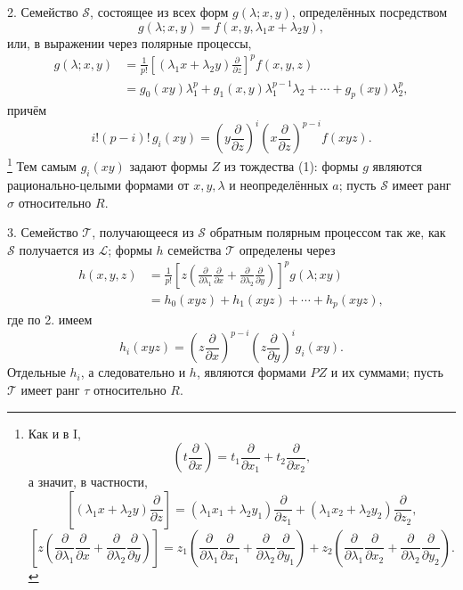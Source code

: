 \documentclass[11pt]{article}
\begin{document}
2. Семейство $\mathcal S$, состоящее из всех форм $g(\lambda;x,y)$, определённых посредством
\[
  g(\lambda;x,y)=f(x,y,\lambda_1x+\lambda_2y),
\]
или, в выражении через полярные процессы,
\[
\begin{aligned}
  g(\lambda;x,y)
  &=\frac1{p!}\left[(\lambda_1x+\lambda_2y)\frac{\partial}{\partial z}\right]^p f(x,y,z) \\
  &=g_0(xy)\lambda_1^p+g_1(x,y)\lambda_1^{p-1}\lambda_2+\cdots+g_p(xy)\lambda_2^p,
\end{aligned}
\]
причём
\[
  i!(p-i)!\,g_i(xy)=
  \left(y\frac{\partial}{\partial z}\right)^i
  \left(x\frac{\partial}{\partial z}\right)^{p-i}f(xyz).
\]
\footnote{Как и в I,
\[
 \left(t\frac{\partial}{\partial x}\right)=t_1\frac{\partial}{\partial x_1}+t_2\frac{\partial}{\partial x_2},
\]
а значит, в частности,
\[
 \left[(\lambda_1x+\lambda_2y)\frac{\partial}{\partial z}\right]
 = (\lambda_1x_1+\lambda_2y_1)\frac{\partial}{\partial z_1}
 + (\lambda_1x_2+\lambda_2y_2)\frac{\partial}{\partial z_2},
\]
\[
 \left[z\left(\frac{\partial}{\partial\lambda_1}\frac{\partial}{\partial x}
 +\frac{\partial}{\partial\lambda_2}\frac{\partial}{\partial y}\right)\right]
 =z_1\left(\frac{\partial}{\partial\lambda_1}\frac{\partial}{\partial x_1}
 +\frac{\partial}{\partial\lambda_2}\frac{\partial}{\partial y_1}\right)
 +z_2\left(\frac{\partial}{\partial\lambda_1}\frac{\partial}{\partial x_2}
 +\frac{\partial}{\partial\lambda_2}\frac{\partial}{\partial y_2}\right).
\]}
Тем самым $g_i(xy)$ задают формы $Z$ из тождества (1): формы $g$ являются рационально-целыми формами от $x,y,\lambda$ и неопределённых $a$; пусть $\mathcal S$ имеет ранг $\sigma$ относительно $R$.

3. Семейство $\mathcal T$, получающееся из $\mathcal S$ обратным полярным процессом так же, как $\mathcal S$ получается из $\mathcal L$; формы $h$ семейства $\mathcal T$ определены через
\[
\begin{aligned}
 h(x,y,z)
 &=\frac1{p!}\left[z\left(\frac{\partial}{\partial\lambda_1}\frac{\partial}{\partial x}
 +\frac{\partial}{\partial\lambda_2}\frac{\partial}{\partial y}\right)\right]^p g(\lambda;xy)\\
 &=h_0(xyz)+h_1(xyz)+\cdots+h_p(xyz),
\end{aligned}
\]
где по 2. имеем
\[
  h_i(xyz)=
  \left(z\frac{\partial}{\partial x}\right)^{p-i}
  \left(z\frac{\partial}{\partial y}\right)^i g_i(xy).
\]
Отдельные $h_i$, а следовательно и $h$, являются формами $PZ$ и их суммами; пусть $\mathcal T$ имеет ранг $\tau$ относительно $R$.
\end{document}
